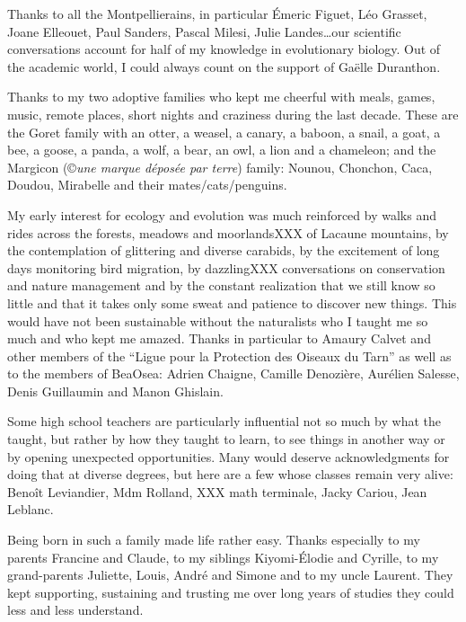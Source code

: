 Thanks to all the Montpellierains, in particular \'{E}meric Figuet, L\'{e}o Grasset, Joane Elleouet, Paul Sanders, Pascal Milesi, Julie Landes\dots our scientific conversations account for half of my knowledge in evolutionary biology.
Out of the academic world, I could always count on the support of Ga\"elle Duranthon.

Thanks to my two adoptive families who kept me cheerful with meals, games, music, remote places, short nights and craziness during the last decade. These are the Goret family with an otter, a weasel, a canary, a baboon, a snail, a goat, a bee, a goose, a panda, a wolf, a bear, an owl, a lion and a chameleon; and the Margicon (\copyright \textit{une marque d\'{e}pos\'{e}e par terre}) family: Nounou, Chonchon, Caca, Doudou, Mirabelle and their mates/cats/penguins.

My early interest for ecology and evolution was much reinforced by walks and rides across the forests, meadows and moorlandsXXX of Lacaune mountains, by the contemplation of glittering and diverse carabids, by the excitement of long days monitoring bird migration, by dazzlingXXX conversations on conservation and nature management and by the constant realization that we still know so little and that it takes only some sweat and patience to discover new things.
This would have not been sustainable without the naturalists who I taught me so much and who kept me amazed. Thanks in particular to Amaury Calvet and other members of the ``Ligue pour la Protection des Oiseaux du Tarn'' as well as to the members of BeaOsea: Adrien Chaigne, Camille Denozière, Aur\'{e}lien Salesse, Denis Guillaumin and Manon Ghislain.

Some high school teachers are particularly influential not so much by what the taught, but rather by how they taught to learn, to see things in another way or by opening unexpected opportunities. Many would deserve acknowledgments for doing that at diverse degrees, but here are a few whose classes remain very alive: Beno\^{i}t Leviandier, Mdm Rolland, XXX math terminale, Jacky Cariou, Jean Leblanc.

Being born in such a family made life rather easy. Thanks especially to my parents Francine and Claude, to my siblings Kiyomi-\'{E}lodie and Cyrille, to my grand-parents Juliette, Louis, Andr\'{e} and Simone and to my uncle Laurent. They kept supporting, sustaining and trusting me over long years of studies they could less and less understand.
